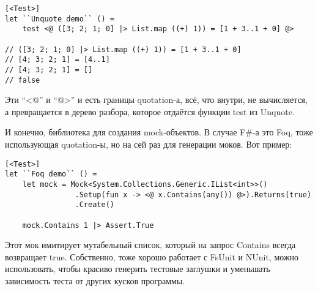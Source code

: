 \documentclass[a5paper]{article}
\begin{document}
\begin{verbatim}
[<Test>]
let ``Unquote demo`` () =
    test <@ ([3; 2; 1; 0] |> List.map ((+) 1)) = [1 + 3..1 + 0] @>

// ([3; 2; 1; 0] |> List.map ((+) 1)) = [1 + 3..1 + 0]
// [4; 3; 2; 1] = [4..1]
// [4; 3; 2; 1] = []
// false
\end{verbatim}

Эти ``<@'' и ``@>'' и есть границы quotation-а, всё, что внутри, не вычисляется, а превращается в дерево разбора, которое отдаётся функции test из Unquote.

И конечно, библиотека для создания mock-объектов. В случае F\#-а это Foq, тоже использующая quotation-ы, но на сей раз для генерации моков. Вот пример:

\begin{verbatim}
[<Test>]
let ``Foq demo`` () =
    let mock = Mock<System.Collections.Generic.IList<int>>()
                .Setup(fun x -> <@ x.Contains(any()) @>).Returns(true)
                .Create()

    mock.Contains 1 |> Assert.True
\end{verbatim}

Этот мок имитирует мутабельный список, который на запрос Contains всегда возвращает true. Собственно, тоже хорошо работает с FsUnit и NUnit, можно использовать, чтобы красиво генерить тестовые заглушки и уменьшать зависимость теста от других кусков программы.
\end{document}
